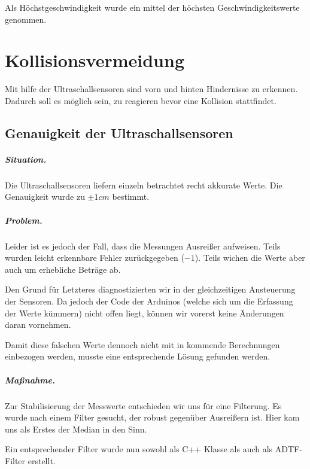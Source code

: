 \documentclass[a4paper,12pt]{report}
\begin{document}
	Als Höchstgeschwindigkeit wurde ein mittel der höchsten Geschwindigkeitswerte genommen.
	

\chapter{Kollisionsvermeidung}

	Mit hilfe der Ultraschallsensoren sind vorn und hinten Hindernisse zu erkennen.
	Dadurch soll es möglich sein, zu reagieren bevor eine Kollision stattfindet.

\section{Genauigkeit der Ultraschallsensoren}

	\paragraph{Situation.}
	Die Ultraschallsensoren liefern einzeln betrachtet recht akkurate Werte.
	Die Genauigkeit wurde zu $\pm1cm$ bestimmt.

	\paragraph{Problem.}
	Leider ist es jedoch der Fall, dass die Messungen Ausreißer aufweisen.
	Teils wurden leicht erkennbare Fehler zurückgegeben ($-1$). Teils wichen die Werte aber auch um erhebliche Beträge ab.

	Den Grund für Letzteres diagnostizierten wir in der gleichzeitigen Ansteuerung der Sensoren.
	Da jedoch der Code der Arduinos (welche sich um die Erfassung der Werte kümmern) nicht offen liegt, können wir vorerst keine Änderungen daran vornehmen.

	Damit diese falschen Werte dennoch nicht mit in kommende Berechnungen einbezogen werden, musste eine entsprechende Lösung gefunden werden.

	\paragraph{Maßnahme.}
	Zur Stabilisierung der Messwerte entschieden wir uns für eine Filterung.
	Es wurde nach einem Filter gesucht, der robust gegenüber Ausreißern ist.
	Hier kam uns als Erstes der Median in den Sinn.

	Ein entsprechender Filter wurde nun sowohl als C++ Klasse als auch als ADTF-Filter erstellt.
\end{document}
